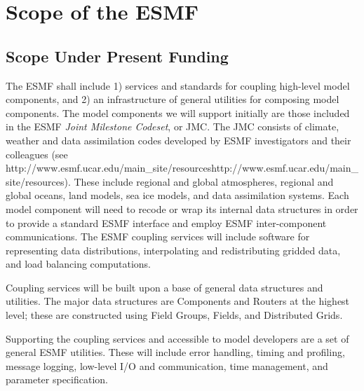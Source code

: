 \section{Scope of the ESMF}

\subsection{Scope Under Present Funding}
The ESMF shall include 1) services and standards for coupling high-level model components,
and 2) an infrastructure of general utilities for composing model components.  The model
components we will support initially are those included in the ESMF {\it Joint Milestone Codeset}, 
or JMC.  The JMC consists of climate, weather and data assimilation codes developed by 
ESMF investigators and their colleagues (see \htmladdnormallink
{http://www.esmf.ucar.edu/main\_site/resources}{http://www.esmf.ucar.edu/main\_site/resources}).  
These include regional and global atmospheres, regional and global oceans, land models, 
sea ice models, and data assimilation 
systems.  Each model component will need to recode or wrap its internal data structures in 
order to provide a standard ESMF interface and employ ESMF inter-component communications.  
The ESMF coupling services will include software for representing data distributions, 
interpolating and redistributing gridded data, and load balancing computations.

Coupling services will be built upon a base of general data structures and utilities.
The major data structures are Components and Routers at the highest level; these are
constructed using Field Groups, Fields, and Distributed Grids.

Supporting the coupling services and accessible to model developers are a set of 
general ESMF utilities.  These will include error handling, timing and profiling, 
message logging, low-level I/O and communication, time management, and parameter 
specification.




